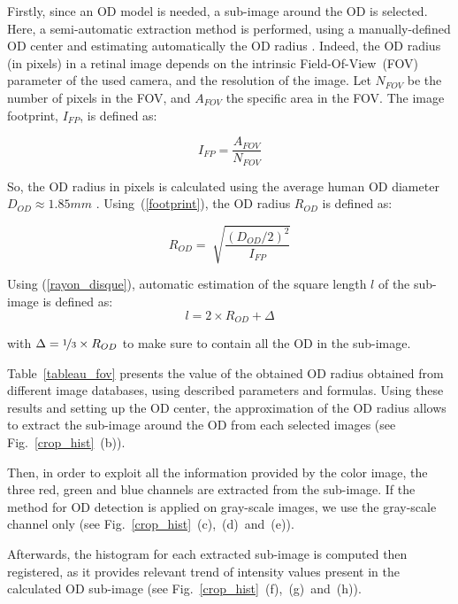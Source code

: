 Firstly, since an OD model is needed, a sub-image around the OD is selected. Here, a semi-automatic extraction method is performed, using a manually-defined OD center and estimating automatically the OD radius \citep{wankhede}. Indeed, the OD radius (in pixels) in a retinal image depends on the intrinsic \mbox{Field-Of-View (FOV)} parameter of the used camera, and the resolution of the image. Let $N_{FOV}$ be the number of pixels in the FOV, and $A_{FOV}$ the specific area in the FOV. The image footprint, $I_{FP}$, is defined as:

\begin{equation}
I_{FP} = \frac{A_{FOV}}{N_{FOV}}
\label{footprint}
\end{equation}

\noindent So, the OD radius in pixels is calculated using the average human OD diameter \mbox{$D_{OD} \approx 1.85mm$} \citep{wankhede}. \mbox{Using (\ref{footprint})}, the OD radius $R_{OD}$ is defined as:

\begin{equation}
R_{OD} =  \sqrt[]{\frac{(D_{OD}/2)^2}{I_{FP}}}
\label{rayon_disque}
\end{equation}

\noindent Using (\ref{rayon_disque}), automatic estimation of the square length $l$ of the sub-image
is defined as:
\begin{equation}
l = 2 \times R_{OD} + \Delta
\label{square_length}
\end{equation}

\noindent with $\Delta = \nicefrac{1}{3} \times R_{OD}$ to make sure to contain all the OD in the sub-image.



\mbox{Table \ref{tableau_fov}} presents the value of the obtained OD radius obtained from different image databases, using described parameters and formulas. Using these results and setting up the OD center, the approximation of the OD radius allows to extract the sub-image around the OD from each selected images (see \mbox{Fig. \ref{crop_hist} (b)}).


Then, in order to exploit all the information provided by the color image, the three red, green and blue channels are extracted from the sub-image. If the method for OD detection is applied on gray-scale images, we use the gray-scale channel only (see \mbox{Fig. \ref{crop_hist} (c), (d) and (e)}).

Afterwards, the histogram for each extracted sub-image is computed then registered, as it provides relevant trend of intensity values present in the calculated OD sub-image (see \mbox{Fig. \ref{crop_hist} (f), (g) and (h)}).


